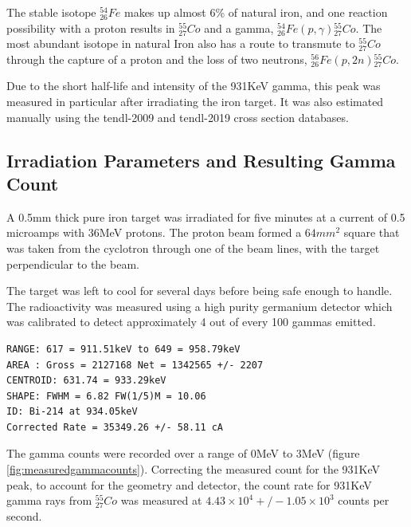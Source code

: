 \FloatBarrier

The stable isotope ${}^{54}_{26} Fe$  makes up almost 6\% of natural iron, and one reaction possibility with a proton results in ${}^{55}_{27} Co$ and a gamma, ${}^{54}_{26} Fe (p, \gamma) {}^{55}_{27} Co$.  The most abundant isotope in natural Iron also has a route to transmute to ${}^{55}_{27} Co$ through the capture of a proton and the loss of two neutrons, ${}^{56}_{26} Fe (p, 2n) {}^{55}_{27} Co$.

Due to the short half-life and intensity of the 931KeV gamma, this peak was measured in particular after irradiating the iron target.  It was also estimated manually using the \acrshort{tendl}-2009 and \acrshort{tendl}-2019 cross section databases.


\FloatBarrier
\subsection{Irradiation Parameters and Resulting Gamma Count}

A 0.5mm thick pure iron target was irradiated for five minutes at a current of 0.5 microamps with 36MeV protons.  The proton beam formed a $64mm^2$ square that was taken from the cyclotron through one of the beam lines, with the target perpendicular to the beam.

The target was left to cool for several days before being safe enough to handle.  The radioactivity was measured using a high purity germanium detector which was calibrated to detect approximately 4 out of every 100 gammas emitted.  

\begin{lstlisting}[style=sMaestro,caption={Maestro 931KeV Peak Measurement},captionpos=b]
RANGE: 617 = 911.51keV to 649 = 958.79keV
AREA : Gross = 2127168 Net = 1342565 +/- 2207
CENTROID: 631.74 = 933.29keV
SHAPE: FWHM = 6.82 FW(1/5)M = 10.06
ID: Bi-214 at 934.05keV
Corrected Rate = 35349.26 +/- 58.11 cA
\end{lstlisting}

The gamma counts were recorded over a range of 0MeV to 3MeV (figure \ref{fig:measuredgammacounts}). Correcting the measured count for the 931KeV peak, to account for the geometry and detector, the count rate for 931KeV gamma rays from ${}^{55}_{27} Co$ was measured at $4.43\times10^4 +/- 1.05 \times 10^3$ counts per second.

